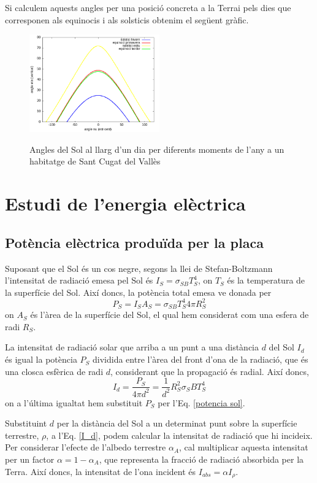 \documentclass[11pt]{article}
\begin{document}
Si calculem aquests angles per una posició concreta a la Terrai pels dies que corresponen als equinocis i als solsticis obtenim el següent gràfic.
\begin{figure}[H]
    \centering
    \includegraphics[width=0.5\textwidth]{equinocis.png}
    \label{solsticis}
    \caption{Angles del Sol al llarg d'un dia per diferents moments de l'any a un habitatge de Sant Cugat del Vallès}
\end{figure}

\section{Estudi de l'energia elèctrica}
\subsection{Potència elèctrica produïda per la placa}
Suposant que el Sol és un cos negre, segons la llei de Stefan-Boltzmann l'intensitat de radiació emesa pel Sol és $I_S = \sigma_{SB}T_S^4$, on $T_S$ és la temperatura de la superfície del Sol. Així doncs, la potència total emesa ve donada per
\begin{equation}
    P_S = I_SA_S=\sigma_{SB}T_S^4 4 \pi R_S^2
    \label{potencia sol}
\end{equation}
on $A_S$ és l'àrea de la superfície del Sol, el qual hem considerat com una esfera de radi $R_S$.

La intensitat de radiació solar que arriba a un punt a una distància $d$ del Sol $I_d$ és igual la potència $P_S$ dividida entre l'àrea del front d'ona de la radiació, que és una closca esfèrica de radi $d$, considerant que la propagació és radial. Així doncs,
\begin{equation}
    I_d = \frac{P_S}{4\pi d^2}=\frac{1}{d^2}R_S^2\sigma_SB T_S^4
    \label{I_d}
\end{equation}
on a l'última igualtat hem substituit $P_S$ per l'Eq. \eqref{potencia sol}.

Substituint $d$ per la distància del Sol a un determinat punt sobre la superfície terrestre, $\rho$, a l'Eq. \eqref{I_d}, podem calcular la intensitat de radiació que hi incideix. Per considerar l’efecte de l’albedo terrestre $\alpha_A$, cal multiplicar aquesta intensitat per un factor $\alpha=1-\alpha_A$, que representa la fracció de radiació absorbida per la Terra. Així doncs, la intensitat de l'ona incident és $I_{abs}=\alpha I_{\rho}$.
\end{document}
